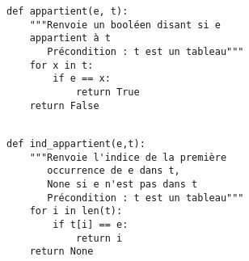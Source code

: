 
\begin{lstlisting}
def appartient(e, t):
    """Renvoie un booléen disant si e 
    appartient à t
       Précondition : t est un tableau"""
    for x in t:
        if e == x:
            return True 
    return False
 
\end{lstlisting}


\begin{lstlisting}
def ind_appartient(e,t):
    """Renvoie l'indice de la première 
       occurrence de e dans t,
       None si e n'est pas dans t
       Précondition : t est un tableau"""
    for i in len(t):
        if t[i] == e:
            return i 
    return None
\end{lstlisting}